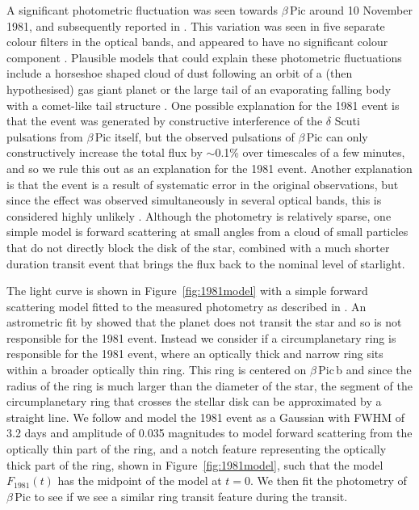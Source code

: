 \documentclass[longauth]{aa} %
\newcommand{\bpb}{$\beta$\,Pic\,b}
\newcommand{\bp}{$\beta$\,Pic}
\begin{document}
A significant photometric fluctuation was seen towards \bp{} around 10 November 1981, and subsequently reported in \citet{LecavelierdesEtangs95}.
%
This variation was seen in five separate colour filters in the optical bands, and appeared to have no significant colour component \citep{Lamers97}.
%
Plausible models that could explain these photometric fluctuations include a horseshoe shaped cloud of dust following an orbit of a (then hypothesised) gas giant planet \citep{LecavelierdesEtangs97} or the large tail of an evaporating falling body with a comet-like tail structure \citep{Lamers97}.
%
One possible explanation for the 1981 event is that the event was generated by constructive interference of the $\delta$ Scuti pulsations from \bp{} itself, but the observed pulsations of \bp{} can only constructively increase the total flux by $\sim$0.1\% over timescales of a few minutes, and so we rule this out as an explanation for the 1981 event.
%
Another explanation is that the event is a result of systematic error in the original observations, but since the effect was observed simultaneously in several optical bands, this is considered highly unlikely \citet{LecavelierdesEtangs95}.
%
Although the photometry is relatively sparse, one simple model is forward scattering at small angles from a cloud of small particles that do not directly block the disk of the star, combined with a much shorter duration transit event that brings the flux back to the nominal level of starlight.

The light curve is shown in Figure~\ref{fig:1981model} with a simple forward scattering model fitted to the measured photometry as described in \citet{Lamers97}.
%
An astrometric fit by \citet{Wang16} showed that the planet does not transit the star and so is not responsible for the 1981 event.
%
Instead we consider if a circumplanetary ring is responsible for the 1981 event, where an optically thick and narrow ring sits within a broader optically thin ring.
%
This ring is centered on \bpb{} and since the radius of the ring is much larger than the diameter of the star, the segment of the circumplanetary ring that crosses the stellar disk can be approximated by a straight line.
%
We follow \citet{Lamers97} and model the 1981 event as a Gaussian with FWHM of 3.2 days and amplitude of 0.035 magnitudes to model forward scattering from the optically thin part of the ring, and a notch feature representing the optically thick part of the ring, shown in Figure~\ref{fig:1981model}, such that the model $F_{1981}(t)$ has the midpoint of the model at $t=0$.
%
We then fit the photometry of \bp{} to see if we see a similar ring transit feature during the transit.
\end{document}
